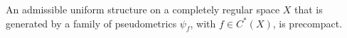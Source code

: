 An admissible uniform structure on a completely regular space $X$ that is generated by a family of pseudometrics $\psi_f$, with $f \in C^*(X)$, is precompact.
